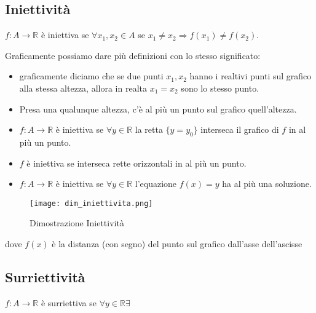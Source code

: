 \documentclass[../main.tex, class=article, 12pt]{subfiles}
\begin{document}
\subsection{Iniettività}\label{sec:iniettività}
\begin{definition}
        $ f : A \to \mathbb{R} $ è iniettiva se $ \forall x_1,x_2 \in A $ se $ x_1 \not = x_2 \Rightarrow f(x_1) \not = f(x_2) $.
\end{definition}

\begin{definition}
        Graficamente possiamo dare più definizioni con lo stesso significato:
\begin{itemize}
        \item  graficamente diciamo che se due punti $ x_1,x_2 $ hanno i realtivi punti sul grafico alla stessa altezza, allora in realta $x_1 = x_2$ sono lo stesso punto.
        \item Presa una qualunque altezza, c'è al più un punto sul grafico quell'altezza. \par
        \item  $ f : A \to \mathbb{R} $ è iniettiva se $ \forall y \in \mathbb{R} $ la retta $ \{y = y_0\} $ interseca il grafico di $ f $ in al più un punto. 
        \item $ f $ è iniettiva se interseca rette orizzontali in al più un punto. 
        \item $ f : A \to \mathbb{R} $ è iniettiva se $ \forall y \in \mathbb{R} $ l'equazione $ f(x) = y $ ha al più una soluzione.
\end{itemize}

\begin{figure}[H]
  	\texttt{[image: dim\_iniettivita.png]}
  	\caption{Dimostrazione Iniettività}
        \label{fig:dim_iniettivita}
\end{figure}


\end{definition}


dove $ f(x) $ è la distanza (con segno) del punto sul grafico dall'asse dell'ascisse



\subsection{Surriettività}\label{sec:surriettività}
\begin{definition}
        $ f: A \to \mathbb{R} $ è surriettiva se $ \forall y \in \mathbb{R} \exists $ 
\end{definition}
\end{document}
